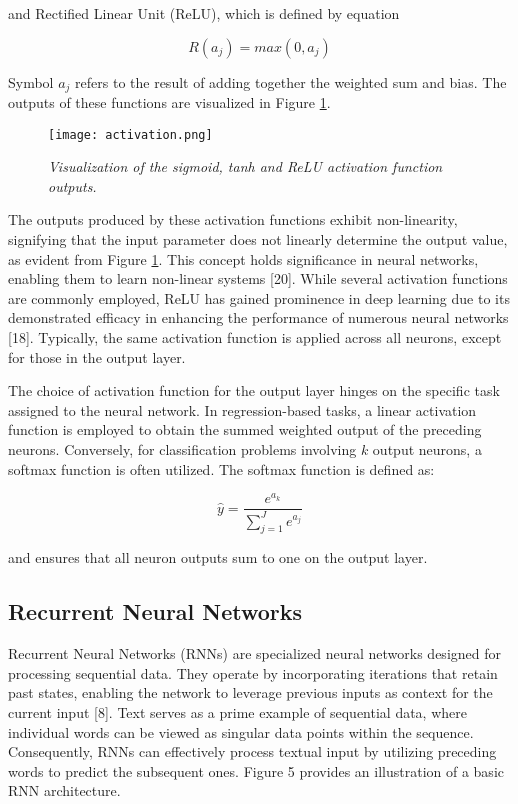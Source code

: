 and Rectified Linear Unit (ReLU), which is defined by equation

\begin{equation}
    R(a_j) = max(0, a_j)
\end{equation}

Symbol \(a_j\) refers to the result of adding together the weighted sum and bias. The
outputs of these functions are visualized in Figure \ref{fig:activation}.


\begin{figure}[H]
    \centering
    \texttt{[image: activation.png]}
    \caption{
        \it{Visualization of the sigmoid, tanh and ReLU activation function outputs.}
    }
    \label{fig:activation}
\end{figure}

The outputs produced by these activation functions exhibit non-linearity, signifying that the input parameter does not linearly determine the output value, as evident from Figure \ref{fig:activation}. This concept holds significance in neural networks, enabling them to learn non-linear systems [20]. While several activation functions are commonly employed, ReLU has gained prominence in deep learning due to its demonstrated efficacy in enhancing the performance of numerous neural networks [18]. Typically, the same activation function is applied across all neurons, except for those in the output layer.

The choice of activation function for the output layer hinges on the specific task assigned to the neural network. In regression-based tasks, a linear activation function is employed to obtain the summed weighted output of the preceding neurons. Conversely, for classification problems involving \(k\) output neurons, a softmax function is often utilized. The softmax function is defined as:

\begin{equation}
    \hat{y} = \frac{e^{a_k}}{\sum_{j=1}^J e^{a_j}}
\end{equation}

\noindent and ensures that all neuron outputs sum to one on the output layer.

\subsection{Recurrent Neural Networks}
\label{sec:rnn}

Recurrent Neural Networks (RNNs) are specialized neural networks designed for processing sequential data. They operate by incorporating iterations that retain past states, enabling the network to leverage previous inputs as context for the current input [8]. Text serves as a prime example of sequential data, where individual words can be viewed as singular data points within the sequence. Consequently, RNNs can effectively process textual input by utilizing preceding words to predict the subsequent ones. Figure 5 provides an illustration of a basic RNN architecture.


